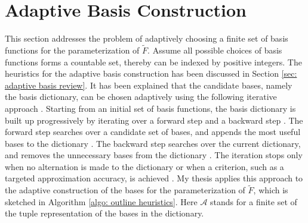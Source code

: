 \section{Adaptive Basis Construction}
\label{sec: adaptive basis}
This section addresses the problem of adaptively choosing a finite set of basis functions
for the parameterization of $\tilde{F}$.
Assume all possible choices of basis functions forms a countable set, thereby can be indexed 
by positive integers.
The heuristics for the adaptive basis construction has been discussed in Section
\ref{sec: adaptive basis review}. It has been explained that the candidate bases, namely the basis
dictionary, can be chosen adaptively using 
the following iterative approach \cite{adaptive basis 1, adaptive basis 2, adaptive basis 3}. 
Starting from an initial set of basis functions,
the basis dictionary is built up progressively 
by iterating over a forward step and a backward step
\cite{adaptive basis 1, adaptive basis 2, adaptive basis 3}.
The forward step searches over a candidate set of bases, and appends the most useful bases 
to the dictionary
\cite{adaptive basis 1, adaptive basis 2, adaptive basis 3}.
The backward step searches over the current dictionary, and removes the 
unnecessary bases from the dictionary
\cite{adaptive basis 1, adaptive basis 2, adaptive basis 3}.
The iteration stops only when no alternation is made to the dictionary or when a criterion, such
as a targeted approximation accuracy,
is achieved \cite{adaptive basis 1, adaptive basis 2, adaptive basis 3}. My thesis applies 
this approach to the adaptive construction of the bases for the parameterization of $\tilde{F}$,
which is sketched in Algorithm \ref{algo: outline heuristics}. Here
$\mathcal{A}$ stands for a finite set of the tuple representation of the bases in the
dictionary.\\

